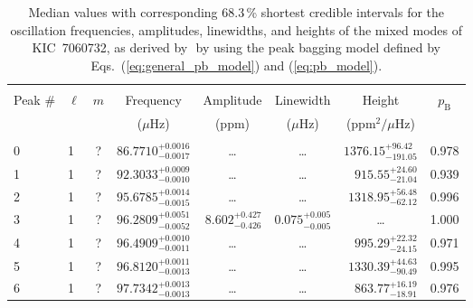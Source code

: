 \begin{table*}[!]
\caption{Median values with corresponding 68.3\,\% shortest credible intervals for the oscillation frequencies, amplitudes, linewidths, and heights of the mixed modes of KIC~7060732, as derived by \diamonds\,\,by using the peak bagging model defined by Eqs.~(\ref{eq:general_pb_model}) and (\ref{eq:pb_model}).}
\label{tab:7060732m}
\centering
\begin{tabular}{llcrrlrc}
\hline\hline
\\[-8pt]          
Peak \# & $\ell$ & $m$ & \multicolumn{1}{c}{Frequency} & \multicolumn{1}{c}{Amplitude} & \multicolumn{1}{c}{Linewidth} & \multicolumn{1}{c}{Height}& $p_\mathrm{B}$\\
 & & & \multicolumn{1}{c}{($\mu$Hz)} & \multicolumn{1}{c}{(ppm)} & \multicolumn{1}{c}{($\mu$Hz)} & \multicolumn{1}{c}{(ppm$^2/\mu$Hz)}\\
\hline \\[-8pt]
0 & 1 & ? & $     86.7710_{-      0.0017}^{+      0.0016}$ & \multicolumn{1}{c}{\dots} & \multicolumn{1}{c}{\dots} & $     1376.15_{-      191.05}^{+       96.42}$ & 0.978\\[1pt]

1 & 1 & ? & $     92.3033_{-      0.0010}^{+      0.0009}$ & \multicolumn{1}{c}{\dots} & \multicolumn{1}{c}{\dots} & $      915.55_{-       21.04}^{+       24.60}$ & 0.939\\[1pt]
2 & 1 & ? & $     95.6785_{-      0.0015}^{+      0.0014}$ & \multicolumn{1}{c}{\dots} & \multicolumn{1}{c}{\dots} & $     1318.95_{-       62.12}^{+       56.48}$ & 0.996\\[1pt]
3 & 1 & ? & $     96.2809_{-      0.0052}^{+      0.0051}$ & $       8.602_{-       0.426}^{+       0.427}$ & $       0.075_{-       0.005}^{+       0.005}$ & \multicolumn{1}{c}{\dots} & 1.000\\[1pt]
4 & 1 & ? & $     96.4909_{-      0.0011}^{+      0.0010}$ & \multicolumn{1}{c}{\dots} & \multicolumn{1}{c}{\dots} & $      995.29_{-       24.15}^{+       22.32}$ & 0.971\\[1pt]
5 & 1 & ? & $     96.8120_{-      0.0013}^{+      0.0011}$ & \multicolumn{1}{c}{\dots} & \multicolumn{1}{c}{\dots} & $     1330.39_{-       90.49}^{+       44.63}$ & 0.995\\[1pt]
6 & 1 & ? & $     97.7342_{-      0.0013}^{+      0.0013}$ & \multicolumn{1}{c}{\dots} & \multicolumn{1}{c}{\dots} & $      863.77_{-       18.91}^{+       16.19}$ & 0.976\\[1pt]


\end{tabular}
\end{table*}
